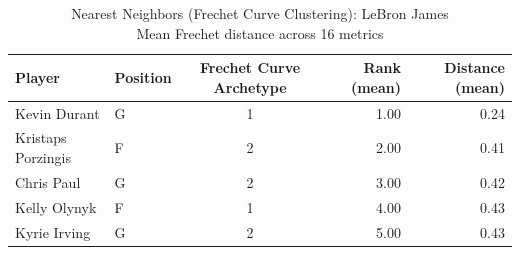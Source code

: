 \begin{table}[t]
\caption*{
{\fontsize{20}{25} Nearest Neighbors (Frechet Curve Clustering): LeBron James\fontsize{12}{15}\selectfont } \\ 
{\fontsize{14}{17}\selectfont  Mean Frechet distance across 16 metrics\fontsize{12}{15}\selectfont }
} 
\fontsize{12.0pt}{14.0pt}\selectfont
\begin{tabular*}{\linewidth}{@{\extracolsep{\fill}}llcrr}
\toprule
Player & Position & Frechet Curve Archetype & Rank (mean) & Distance (mean) \\ 
\midrule\addlinespace[2.5pt]
Kevin Durant & G & 1 & 1.00 & 0.24 \\ 
Kristaps Porzingis & F & 2 & 2.00 & 0.41 \\ 
Chris Paul & G & 2 & 3.00 & 0.42 \\ 
Kelly Olynyk & F & 1 & 4.00 & 0.43 \\ 
Kyrie Irving & G & 2 & 5.00 & 0.43 \\ 
\bottomrule
\end{tabular*}
\end{table}

